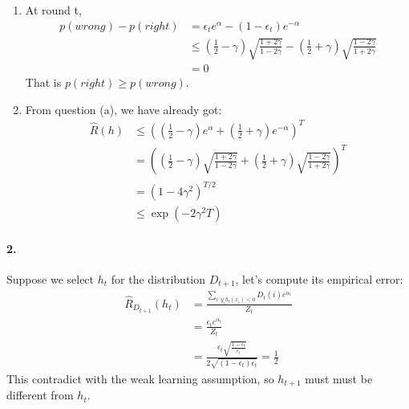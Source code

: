 \documentclass[a4paper]{article}
\begin{document}
\begin{enumerate}[{(a)}]
            \item
                At round t,
                \begin{equation} \label{eq2}
                    \begin{split}
                        p(wrong) - p(right) & = \epsilon_{t}e^{\alpha} - (1-\epsilon_{t})e^{-\alpha} \\
                                            & \leq (\frac{1}{2} - \gamma) \sqrt{\frac{1 + 2\gamma}{1 - 2\gamma}} - (\frac{1}{2} + \gamma) \sqrt{\frac{1 - 2\gamma}{1 + 2\gamma}} \\
                                            & = 0
                    \end{split}
                \end{equation}
                That is $p(right) \geq p(wrong)$.
             \item
                From question (a), we have already got:
                \begin{equation} \label{eq3}
                    \begin{split}
                        \hat{R}(h) & \leq ((\frac{1}{2} - \gamma)e^{\alpha} + (\frac{1}{2} + \gamma)e^{-\alpha})^{T} \\
                                   & = ((\frac{1}{2} - \gamma) \sqrt{\frac{1 + 2\gamma}{1 - 2\gamma}} + (\frac{1}{2} + \gamma) \sqrt{\frac{1 - 2\gamma}{1 + 2\gamma}})^{T} \\
                                   & = (1-4\gamma^{2})^{T/2} \\
                                   & \leq \exp(-2\gamma^{2}T)
                    \end{split}
                \end{equation}
             \end{enumerate}
    \paragraph{2.}
        Suppose we select $h_{t}$ for the distribution $D_{t+1}$, let's compute its empirical error:
            \begin{equation} \label{eq4}
                \begin{split}
                    \hat{R}_{D_{t+1}}(h_t) &= \frac{\sum\limits_{i:y_i h_t(x_i)<0}D_t(i)e^{\alpha_t}}{Z_t} \\
                                           &= \frac{\epsilon_{t}e^{\alpha_t}}{Z_t} \\
                                           &= \frac{\epsilon_{t} \sqrt{\frac{1-\epsilon_t}{\epsilon_t}}}{2\sqrt{(1-\epsilon_t)\epsilon_t}} = \frac{1}{2}
                \end{split}
            \end{equation}
        This contradict with the weak learning assumption, so $h_{t+1}$ must must be different from $h_t$. 
\end{document}
